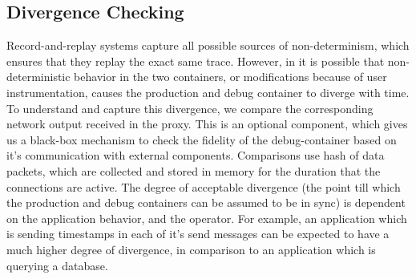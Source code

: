 
\subsection{Divergence Checking}
\label{sec:divergenceChecking}

Record-and-replay systems capture all possible sources of non-determinism, which ensures that they replay the exact same trace. 
However, in \parikshan it is possible that non-deterministic behavior in the two containers, or modifications because of user instrumentation, causes the production and debug container to diverge with time.
To understand and capture this divergence, we compare the corresponding network output received in the proxy.
This is an optional component, which gives us a black-box mechanism to check the fidelity of the debug-container based on it's communication with external components.
Comparisons use hash of data packets, which are collected and stored in memory for the duration that the connections are active.
The degree of acceptable divergence (the point till which the production and debug containers can be assumed to be in sync) is dependent on the application behavior, and the operator. 
For example, an application which is sending timestamps in each of it's send messages can be expected to have a much higher degree of divergence, in comparison to an application which is querying a database.
